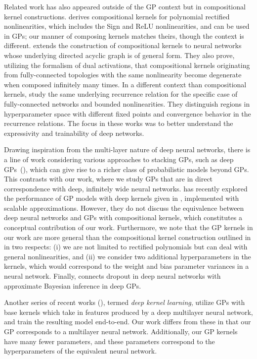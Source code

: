 \documentclass{article} %
\begin{document}
Related work has also appeared outside of the GP context but in compositional kernel constructions. \cite{cho2009} derives compositional kernels for polynomial rectified nonlinearities, which includes the Sign and ReLU nonlinearities, and can be used in GPs; our manner of composing kernels matches theirs, though the context is different. \cite{daniely2016} extends the construction of compositional kernels to neural networks whose underlying directed acyclic graph is of general form. They also prove, utilizing the formalism of dual activations, that compositional kernels originating from fully-connected topologies with the same nonlinearity become degenerate when composed infinitely many times. In a different context than compositional kernels, \cite{poole2016exponential, schoenholz2016} study the same underlying recurrence relation for the specific case of fully-connected networks and bounded nonlinearities. They distinguish regions in hyperparameter space with different fixed points and convergence behavior in the recurrence relations. The focus in these works was to better understand the expressivity and trainability of deep networks. 

Drawing inspiration from the multi-layer nature of deep neural networks, there is a line of work considering various approaches to stacking GPs, such as deep GPs~(\cite{lawrence2007hierarchical, damianou2013deep, hensman2014nested, duvenaud2014, bui2016deep}), which can give rise to a richer class of probabilistic models beyond GPs. This contrasts with our work, where we study GPs that are in direct correspondence with deep, infinitely wide neural networks. \cite{krauth2016} has recently explored the performance of GP models with deep kernels given in \cite{cho2009}, implemented with scalable approximations. However, they do not discuss the equivalence between deep neural networks and GPs with compositional kernels, which constitutes a conceptual contribution of our work. Furthermore, we note that the GP kernels in our work are more general than the compositional kernel construction outlined in \cite{cho2009} in two respects: (i) we are not limited to rectified polynomials but can deal with general nonlinearities, and (ii) we consider two additional hyperparameters in the kernels, which would correspond to the weight and bias parameter variances in a neural network. Finally, \cite{gal2016dropout} connects dropout in deep neural networks with approximate Bayesian inference in deep GPs.

Another series of recent works (\cite{wilson2016a, wilson2016b, al2017learning}), termed \emph{deep kernel learning}, utilize GPs with base kernels which take in features produced by a deep multilayer neural network, and train the resulting model end-to-end. Our work differs from these in that 
our GP corresponds to a multilayer neural network. 
Additionally, our GP kernels have many fewer parameters, and these parameters correspond to the hyperparameters of the equivalent neural network.
\end{document}
